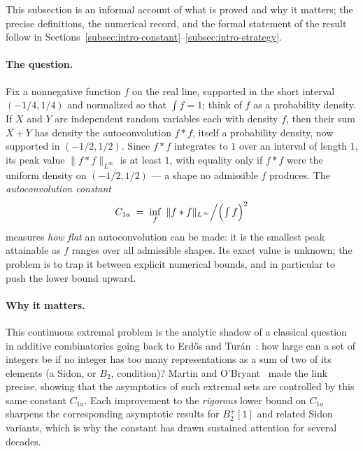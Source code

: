 \documentclass[11pt, letterpaper]{article}
\theoremstyle{paperplain}
\theoremstyle{paperdef}
\newcommand{\Linf}{L^\infty}
\begin{document}
This subsection is an informal account of what is proved and why it
matters; the precise definitions, the numerical record, and the formal
statement of the result follow in
Sections~\ref{subsec:intro-constant}--\ref{subsec:intro-strategy}.

\paragraph{The question.}
Fix a nonnegative function $f$ on the real line, supported in the short
interval $(-1/4,1/4)$ and normalized so that $\int f=1$; think of $f$
as a probability density.  If $X$ and $Y$ are independent random
variables each with density $f$, then their sum $X+Y$ has density the
autoconvolution $f*f$, itself a probability density, now supported in
$(-1/2,1/2)$.  Since $f*f$ integrates to $1$ over an interval of
length $1$, its peak value $\|f*f\|_{\Linf}$ is at least $1$, with
equality only if $f*f$ were the uniform density on $(-1/2,1/2)$ --- a
shape no admissible $f$ produces.  The \emph{autoconvolution constant}
\[
  C_{1a}
  \;=\;
  \inf_{f}\ \|f*f\|_{\Linf}\Big/\Bigl(\textstyle\int f\Bigr)^{2}
\]
measures \emph{how flat} an autoconvolution can be made: it is the
smallest peak attainable as $f$ ranges over all admissible shapes.
Its exact value is unknown; the problem is to trap it between explicit
numerical bounds, and in particular to push the lower bound upward.

\paragraph{Why it matters.}
This continuous extremal problem is the analytic shadow of a classical
question in additive combinatorics going back to Erd\H{o}s and
Tur\'an~\cite{ET41}: how large can a set of integers be if no integer
has too many representations as a sum of two of its elements (a Sidon,
or $B_2$, condition)?  Martin and O'Bryant~\cite{MO2009} made the link
precise, showing that the asymptotics of such extremal sets are
controlled by this same constant $C_{1a}$.  Each improvement to the
\emph{rigorous} lower bound on $C_{1a}$ sharpens the corresponding
asymptotic results for $B_2^{+}[1]$ and related Sidon variants, which
is why the constant has drawn sustained attention for several decades.
\end{document}
